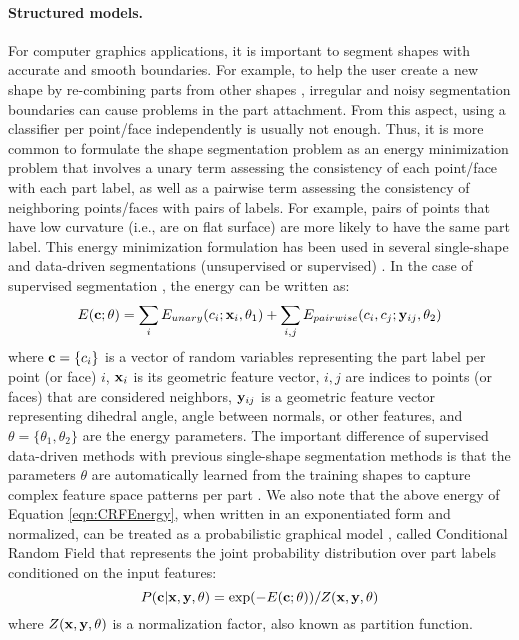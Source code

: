 \paragraph*{Structured models.} For computer graphics applications, it is important to segment shapes with accurate and smooth boundaries. For example, to help the user create a new shape by re-combining parts from other shapes \cite{Funkhouser:2004:MBE}, irregular and noisy segmentation boundaries can cause problems in the part attachment. From this aspect, using a classifier per point/face independently is usually not enough. Thus, it is more common to formulate the shape segmentation problem as an energy minimization problem that involves a unary term assessing the consistency of each point/face with each part label, as well as a pairwise term assessing the consistency of neighboring points/faces with pairs of labels. For example, pairs of points that have low curvature (i.e., are on flat surface) are more likely to have the same part label. This energy minimization formulation has been used in several single-shape and data-driven segmentations (unsupervised or supervised) \cite{Katz:2003:HMD,Anguelov:2005:DLM,Shapira:2010:CPA,Kalogerakis:2010:LMS}. In the case of supervised segmentation \cite{Kalogerakis:2010:LMS}, the energy can be written as:
\begin{equation}
E(\mathbf{c}; \theta) = \sum_i E_{unary}(c_i; \mathbf{x}_i, \theta_1) + \sum_{i,j} E_{pairwise}(c_i, c_j; \mathbf{y}_{ij}, \theta_2)
\label{eqn:CRFEnergy}
\end{equation}
where $\mathbf{c}=\{c_i\}$ is a vector of random variables representing the part label per point (or face) $i$, $\mathbf{x}_i$ is its geometric feature vector, $i,j$ are indices to points (or faces) that are considered neighbors, $\mathbf{y}_{ij}$ is a geometric feature vector representing dihedral angle, angle between normals, or other features, and $\theta=\{\theta_1,\theta_2\}$  are the energy parameters.  The important difference of supervised data-driven methods with previous single-shape segmentation methods is that the parameters $\theta$ are automatically learned from the training shapes to capture complex feature space patterns per part \cite{Anguelov:2005:DLM,Kalogerakis:2010:LMS}. We also note that the above energy of Equation \ref{eqn:CRFEnergy}, when written in an exponentiated form and normalized, can be treated as a probabilistic graphical model \cite{Koller:2009:PGM}, called Conditional Random Field \cite{Lafferty:2001:CRF} that represents the joint probability distribution over part labels conditioned on the input features:
\begin{equation}
P(\mathbf{c} | \mathbf{x}, \mathbf{y}, \theta)= \exp(-E(\mathbf{c};\theta))/ Z(\mathbf{x},\mathbf{y},\theta)
\label{eqn:CRFConditional}
\end{equation}
where $Z(\mathbf{x},\mathbf{y},\theta)$ is a normalization factor, also known as partition function. 


